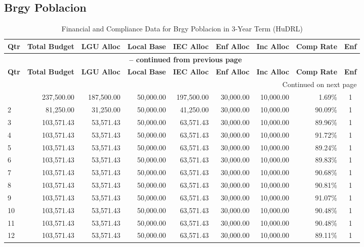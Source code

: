 \subsection{Brgy Poblacion}
\begin{longtable}{lrrrrrrrc}
\caption{Financial and Compliance Data for Brgy Poblacion in 3-Year Term (HuDRL)} \\
\toprule
\textbf{Qtr} & \textbf{Total Budget} & \textbf{LGU Alloc} & \textbf{Local Base} & \textbf{IEC Alloc} & \textbf{Enf Alloc} & \textbf{Inc Alloc} & \textbf{Comp Rate} & \textbf{Enf} \\
\midrule
\endfirsthead
\multicolumn{9}{c}{{\bfseries \tablename\ \thetable{} -- continued from previous page}} \\
\toprule
\textbf{Qtr} & \textbf{Total Budget} & \textbf{LGU Alloc} & \textbf{Local Base} & \textbf{IEC Alloc} & \textbf{Enf Alloc} & \textbf{Inc Alloc} & \textbf{Comp Rate} & \textbf{Enf} \\
\midrule
\endhead
\hline \multicolumn{9}{r}{{Continued on next page}} \\ \hline
\endfoot
\bottomrule
\endlastfoot
1 & 237,500.00 & 187,500.00 & 50,000.00 & 197,500.00 & 30,000.00 & 10,000.00 & 1.69\% & 1 \\
2 & 81,250.00 & 31,250.00 & 50,000.00 & 41,250.00 & 30,000.00 & 10,000.00 & 90.09\% & 1 \\
3 & 103,571.43 & 53,571.43 & 50,000.00 & 63,571.43 & 30,000.00 & 10,000.00 & 89.96\% & 1 \\
4 & 103,571.43 & 53,571.43 & 50,000.00 & 63,571.43 & 30,000.00 & 10,000.00 & 91.72\% & 1 \\
5 & 103,571.43 & 53,571.43 & 50,000.00 & 63,571.43 & 30,000.00 & 10,000.00 & 89.24\% & 1 \\
6 & 103,571.43 & 53,571.43 & 50,000.00 & 63,571.43 & 30,000.00 & 10,000.00 & 89.83\% & 1 \\
7 & 103,571.43 & 53,571.43 & 50,000.00 & 63,571.43 & 30,000.00 & 10,000.00 & 90.68\% & 1 \\
8 & 103,571.43 & 53,571.43 & 50,000.00 & 63,571.43 & 30,000.00 & 10,000.00 & 90.81\% & 1 \\
9 & 103,571.43 & 53,571.43 & 50,000.00 & 63,571.43 & 30,000.00 & 10,000.00 & 91.07\% & 1 \\
10 & 103,571.43 & 53,571.43 & 50,000.00 & 63,571.43 & 30,000.00 & 10,000.00 & 90.48\% & 1 \\
11 & 103,571.43 & 53,571.43 & 50,000.00 & 63,571.43 & 30,000.00 & 10,000.00 & 90.48\% & 1 \\
12 & 103,571.43 & 53,571.43 & 50,000.00 & 63,571.43 & 30,000.00 & 10,000.00 & 89.11\% & 1 \\
\end{longtable}
\newpage
